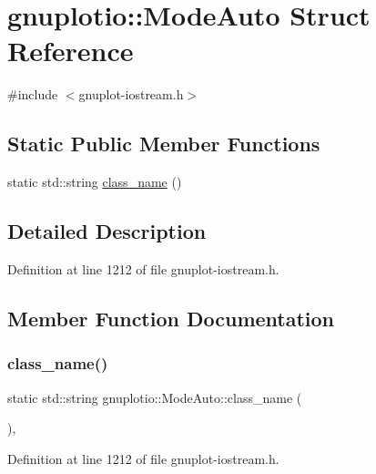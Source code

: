 \hypertarget{structgnuplotio_1_1_mode_auto}{}\section{gnuplotio\+:\+:Mode\+Auto Struct Reference}
\label{structgnuplotio_1_1_mode_auto}


{\ttfamily \#include $<$gnuplot-\/iostream.\+h$>$}

\subsection*{Static Public Member Functions}
\begin{DoxyCompactItemize}
\item 
static std\+::string \hyperlink{structgnuplotio_1_1_mode_auto_ac73f89a782ac32dd8bc7b8f7a7581523}{class\+\_\+name} ()
\end{DoxyCompactItemize}


\subsection{Detailed Description}


Definition at line 1212 of file gnuplot-\/iostream.\+h.



\subsection{Member Function Documentation}
\mbox{\label{structgnuplotio_1_1_mode_auto_ac73f89a782ac32dd8bc7b8f7a7581523}} 
\subsubsection{\texorpdfstring{class\+\_\+name()}{class\_name()}}
{\footnotesize\ttfamily static std\+::string gnuplotio\+::\+Mode\+Auto\+::class\+\_\+name (\begin{DoxyParamCaption}{ }\end{DoxyParamCaption})\hspace{0.3cm}{\ttfamily [inline]}, {\ttfamily [static]}}



Definition at line 1212 of file gnuplot-\/iostream.\+h.



